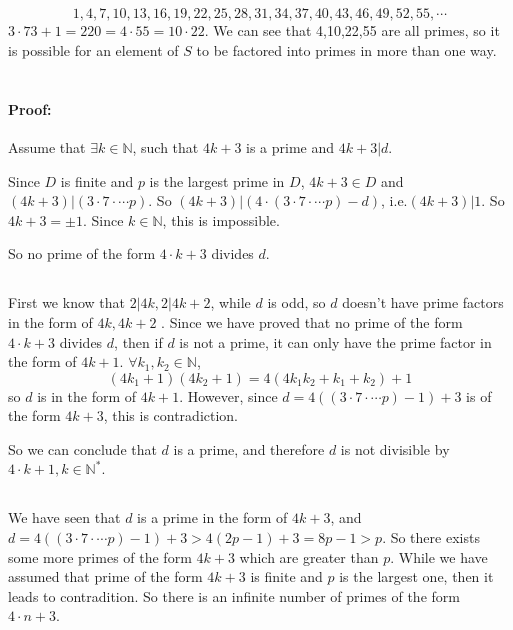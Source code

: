 \documentclass[a4paper,12pt,titlepage]{article}
\begin{document}
\subsection{}
$$1,4,7,10,13,16,19,22,25,28,31,34
,37,40,43,46,49,52,55,\cdots$$
$3\cdot 73+1=220=4\cdot 55=10\cdot 22$. We can see that 4,10,22,55 are all primes, so it is possible for an element of $S$ to be factored into primes in more than one way.

\section{}
\subsection{}
\paragraph{Proof:}Assume that $\exists k\in\mathbb{N}$, such that $4k+3$ is a prime and $4k+3|d$.

Since $D$ is finite and $p$ is the largest prime in $D$, $4k+3\in D$ and$(4k+3)|(3\cdot7\cdot\cdots p)$. So $(4k+3)|(4\cdot(3\cdot7\cdot\cdots p)-d) $, i.e.$(4k+3)|1$. So $4k+3=\pm 1$. Since $k\in\mathbb{N}$, this is impossible.

So no prime of the form $4\cdot k+3$ divides $d$.

\subsection{}
First we know that $2|4k,2|4k+2$, while $d$ is odd, so $d$ doesn't have prime factors in the form of $4k,4k+2$ . Since we have proved that no prime of the form $4\cdot k+3$ divides $d$, then if $d$ is not a prime, it can only have the prime factor in the form of $4k+1$.  
$\forall k_1,k_2\in\mathbb{N}$, 
$$(4k_1+1)(4k_2+1)=4(4k_1k_2+k_1+k_2)+1$$
so $d$ is in the form of $4k+1$. However, since $d=4((3\cdot7\cdot\cdots p)-1)+3$ is of the form $4k+3$, this is contradiction.

So we can conclude that $d$ is a prime, and therefore $d$ is not divisible by $4\cdot k+1,k\in\mathbb{N}^*$.

\subsection{}
We have seen that $d$ is a prime in the form of $4k+3$, and $d=4((3\cdot7\cdot\cdots p)-1)+3>4(2p-1)+3=8p-1>p$. So there exists some more primes of the form $4k+3$ which are greater than $p$. While we have assumed that prime of the form $4k+3$ is finite and $p$ is the largest one, then it leads to contradition. So there is an infinite number of primes of the form $4\cdot n+3$.
\end{document}
